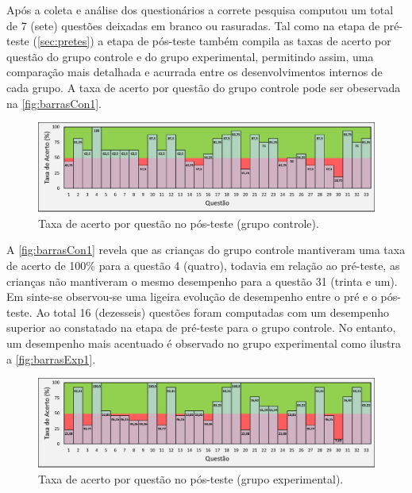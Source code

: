 Após a coleta e análise dos questionários a correte pesquisa computou um total de 7 (sete) questões deixadas em branco ou rasuradas. Tal como na etapa de pré-teste (\autoref{sec:pretes}) a etapa de pós-teste também compila as taxas de acerto por questão do grupo controle e do grupo experimental, permitindo assim, uma comparação mais detalhada e acurrada entre os desenvolvimentos internos de cada grupo. A taxa de acerto por questão do grupo controle pode ser obeservada na  \autoref{fig:barrasCon1}.


\begin{figure}[htb]

    \caption{\label{fig:barrasCon1}Taxa de acerto por questão no pós-teste (grupo controle).}
    \includegraphics[width=\linewidth]{./Visuais/NotasControlePOS.pdf}
  
\end{figure}

A \autoref{fig:barrasCon1} revela que as crianças do grupo controle mantiveram uma taxa de acerto de 100\% para a questão 4 (quatro), todavia em relação ao pré-teste, as crianças não mantiveram o mesmo desempenho para a questão 31 (trinta e um). Em sinte-se observou-se uma ligeira evolução de desempenho entre o pré e o pós-teste. Ao total 16 (dezesseis) questões foram computadas com um desempenho superior ao constatado na etapa de pré-teste para o grupo controle. 
No entanto, um desempenho mais acentuado é observado no grupo experimental como ilustra a \autoref{fig:barrasExp1}.


\begin{figure}[htb]

    \caption{\label{fig:barrasExp1}Taxa de acerto por questão no pós-teste (grupo experimental).}
    \includegraphics[width=\linewidth]{./Visuais/NotasExperimentalPOS.pdf}
  
\end{figure}

